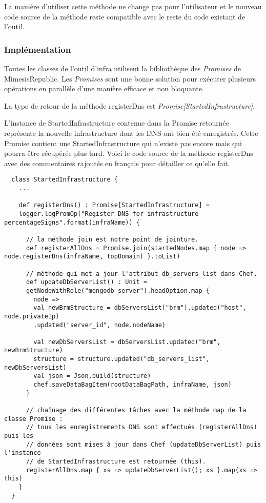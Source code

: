 La manière d'utiliser cette méthode ne change pas pour l'utilisateur et le
nouveau code source de la méthode reste compatible avec le reste du code
existant de l'outil.

\subsubsection{Implémentation}

Toutes les classes de l'outil d'infra utilisent la bibliothèque des
\textit{Promises} de MimesisRepublic.
Les \textit{Promises} sont une bonne solution pour exécuter plusieurs opérations
en parallèle d'une manière efficace et non bloquante.

La type de retour de la méthode registerDns est
\textit{Promise[StartedInfrastructure]}.

L'instance de StartedInfrastructure contenue dans la Promise retournée
représente la nouvelle infrastructure dont les DNS ont bien été enregistrés.
Cette Promise contient une StartedInfrastructure qui n'existe pas encore mais
qui pourra être récupérée plus tard.
Voici le code source de la méthode registerDns avec des commentaires rajoutés en
français pour détailler ce qu'elle fait.
\lstset{language=Scala}
\begin{lstlisting}
  class StartedInfrastructure {
    ...

    def registerDns() : Promise[StartedInfrastructure] = 
    logger.logPromOp("Register DNS for infrastructure percentageSigns".format(infraName)) {

      // la méthode join est notre point de jointure.
      def registerAllDns = Promise.join(startedNodes.map { node => node.registerDns(infraName, topDomain) }.toList)

      // méthode qui met a jour l'attribut db_servers_list dans Chef.
      def updateDbServerList() : Unit =
      getNodeWithRole("mongodb_server").headOption.map { 
        node =>
        val newBrmStructure = dbServersList("brm").updated("host", node.privateIp)
        .updated("server_id", node.nodeName)

        val newDbServersList = dbServersList.updated("brm", newBrmStructure)
        structure = structure.updated("db_servers_list", newDbServersList)
        val json = Json.build(structure)
        chef.saveDataBagItem(rootDataBagPath, infraName, json)
      }

      // chaînage des différentes tâches avec la méthode map de la classe Promise :
      // tous les enregistrements DNS sont effectués (registerAllDns) puis les
      // données sont mises à jour dans Chef (updateDbServerList) puis l'instance 
      // de StartedInfrastructure est retournée (this).
      registerAllDns.map { xs => updateDbServerList(); xs }.map(xs => this)
    }
  }
\end{lstlisting}

